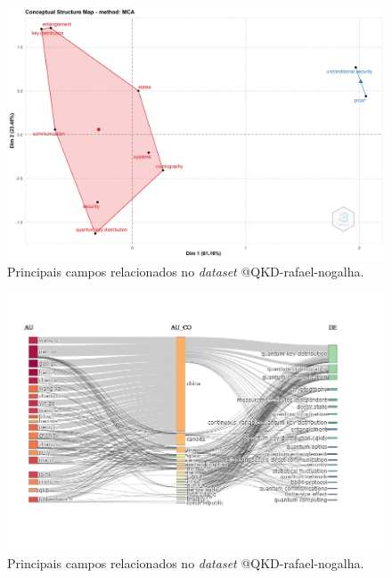 \begin{figure}[H]
    \centering
    \includegraphics[width=1\textwidth]{experiments/rafaelnogalha/PesquisaBibliografica/QKDSegurancaComputacional/images/mapa_fatorial.png}
    \caption{Principais campos relacionados no \textit{dataset} @QKD-rafael-nogalha.}
    \label{fig:mapa:fatorial:@QKD-rafael-nogalha}
\end{figure}

\begin{figure}[H]
    \centering
    \includegraphics[width=1\textwidth]{experiments/rafaelnogalha/PesquisaBibliografica/QKDSegurancaComputacional/images/three_fields_plot_qkd.png}
    \caption{Principais campos relacionados no \textit{dataset} @QKD-rafael-nogalha.}
    \label{fig:three:plot:@QKD-rafael-nogalha}
\end{figure}

